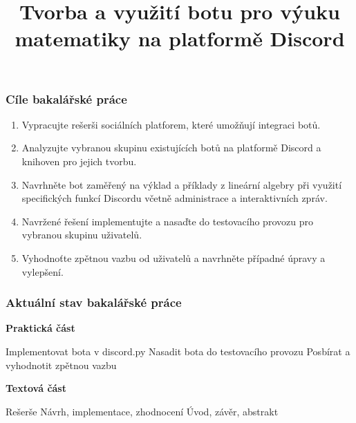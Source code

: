 \documentclass[FM]{tulpresentation} %
\title{Tvorba a využití botu pro výuku matematiky na platformě Discord}
\begin{document}
	\TULtitleframe
	\begin{frame}
		\frametitle{Cíle bakalářské práce}
		\begin{enumerate}
			\item Vypracujte rešerši sociálních platforem, které umožňují integraci botů.
			\item Analyzujte vybranou skupinu existujících botů na platformě Discord a knihoven pro jejich tvorbu.
			\item Navrhněte bot zaměřený na výklad a příklady z lineární algebry při využití specifických funkcí Discordu včetně administrace a interaktivních zpráv.
			\item Navržené řešení implementujte a nasaďte do testovacího provozu pro vybranou skupinu uživatelů.
			\item Vyhodnoťte zpětnou vazbu od uživatelů a navrhněte případné úpravy a vylepšení.
		\end{enumerate}
	\end{frame}
	\begin{frame}
		\frametitle{Aktuální stav bakalářské práce}
		\bigskip
		\textbf{Praktická část}
		\begin{itemize}
			\itemChX Implementovat bota v discord.py
			\itemChX Nasadit bota do testovacího provozu
			\itemChO Posbírat a vyhodnotit zpětnou vazbu
		\end{itemize}
		\bigskip
		\textbf{Textová část}
		\begin{itemize}
			\itemChX Rešerše
			\itemChO Návrh, implementace, zhodnocení
			\itemChO Úvod, závěr, abstrakt
		\end{itemize}
	\end{frame}
\end{document}
